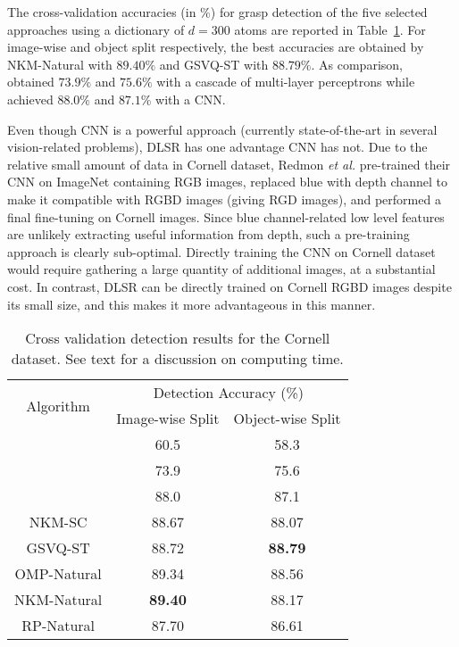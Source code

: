 \documentclass[svgnames]{scrartcl}
\begin{document}
The cross-validation accuracies (in \%) for grasp detection of the five selected approaches using a dictionary of $d=300$ atoms are reported in Table~\ref{tab:detection_results}. For image-wise and object split respectively, the best accuracies are obtained by NKM-Natural with $89.40\%$ and GSVQ-ST with $88.79\%$. As comparison,~\citet{lenz2015deep} obtained $73.9\%$ and $75.6\%$ with a cascade of multi-layer perceptrons while~\citet{redmonRealtimeCnnGrasp} achieved $88.0\%$ and $87.1\%$ with a CNN. 


Even though CNN is a powerful approach (currently state-of-the-art in several vision-related problems), DLSR has one advantage CNN has not. Due to the relative small amount of data in Cornell dataset, Redmon \textit{et al.} pre-trained their CNN on ImageNet containing RGB images, replaced blue with depth channel to make it compatible with RGBD images (giving RGD images), and performed a final fine-tuning on Cornell images. Since blue channel-related low level features are unlikely extracting useful information from depth, such a pre-training approach is clearly sub-optimal. Directly training the CNN on Cornell dataset would require gathering a large quantity of additional images, at a substantial cost. In contrast, DLSR can be directly trained on Cornell RGBD images despite its small size, and this makes it more advantageous in this manner.


\begin{table}[t]
\caption{Cross validation detection results for the Cornell dataset. See text for a discussion on computing time.}
\begin{center}
\begin{tabular}{c|cc}
\hline \hline
\multirow{2}{*}{Algorithm} & \multicolumn{2}{c}{Detection Accuracy (\%)} \\
& Image-wise Split & Object-wise Split \\
\hline
\citet{jiang2011efficient} & 60.5 & 58.3 \\
\citet{lenz2015deep} & 73.9 & 75.6 \\
\citet{redmonRealtimeCnnGrasp} & 88.0 & 87.1 \\
\hline
NKM-SC & 88.67 & 88.07 \\
GSVQ-ST & 88.72 & \textbf{88.79} \\
OMP-Natural &  89.34 & 88.56 \\
NKM-Natural & \textbf{89.40} & 88.17 \\
RP-Natural & 87.70 & 86.61 \\
\hline \hline
\end{tabular}
\end{center}
\label{tab:detection_results}
\end{table}
\end{document}
